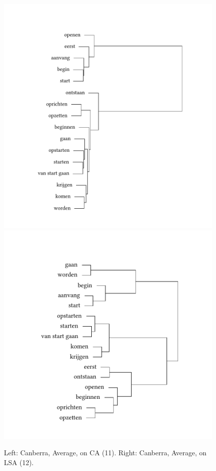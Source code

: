 \begin{figure}
\includegraphics[width=.48\textwidth,trim=95 40 75 75]{figures/tree40.pdf}\hfill%
\includegraphics[width=.48\textwidth,trim=95 40 75 75]{figures/tree41.pdf}
\caption{\label{fig:3:40}Left:  Canberra, Average, on CA (11). Right:\label{fig:3:41} Canberra, Average, on LSA (12).}
\end{figure}

